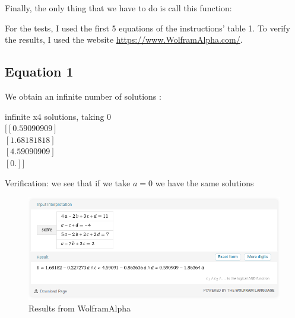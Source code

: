 Finally, the only thing that we have to do is call this function:


For the tests, I used the first 5 equations of the instructions' table 1.
To verify the results, I used the website \url{https://www.WolframAlpha.com/}.
\subsection{Equation 1}

We obtain an infinite number of solutions : \\
\begin{resultbox}
    infinite x4 solutions, taking 0\\
    $[[0.59090909]$\\
    $ [1.68181818]$\\
    $ [4.59090909]$\\
    $ [0.        ]]$
\end{resultbox}
Verification: we see that if we take $a=0$ we have the same solutions
\begin{figure}[H]
  \centering
  \includegraphics[width=14cm]{images/lineq1.png}
  \caption{Results from WolframAlpha}
  \label{fig:lineq1}
\end{figure}

